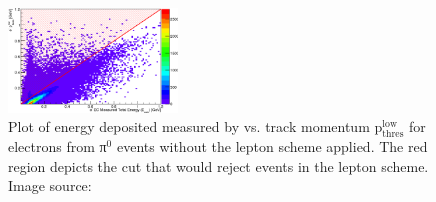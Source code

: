\begin{figure}\begin{center}
\includegraphics[width=0.4\textwidth]{figures/lepton/Pim_EClowcut.eps}
\caption[ Deposited Energy Comparison to Track Momentum for e$^-$ Candidates]{\label{fig:islep.pimEC}Plot of energy deposited measured by  vs. track momentum p$\mathrm{_{thres}^{low}}$ for electrons from π$^0$ events without the  lepton   scheme applied. The red region depicts the cut that would reject events in the  lepton   scheme. Image source:~\cite{clas.thesis.kunkel}}
\end{center}\end{figure}

